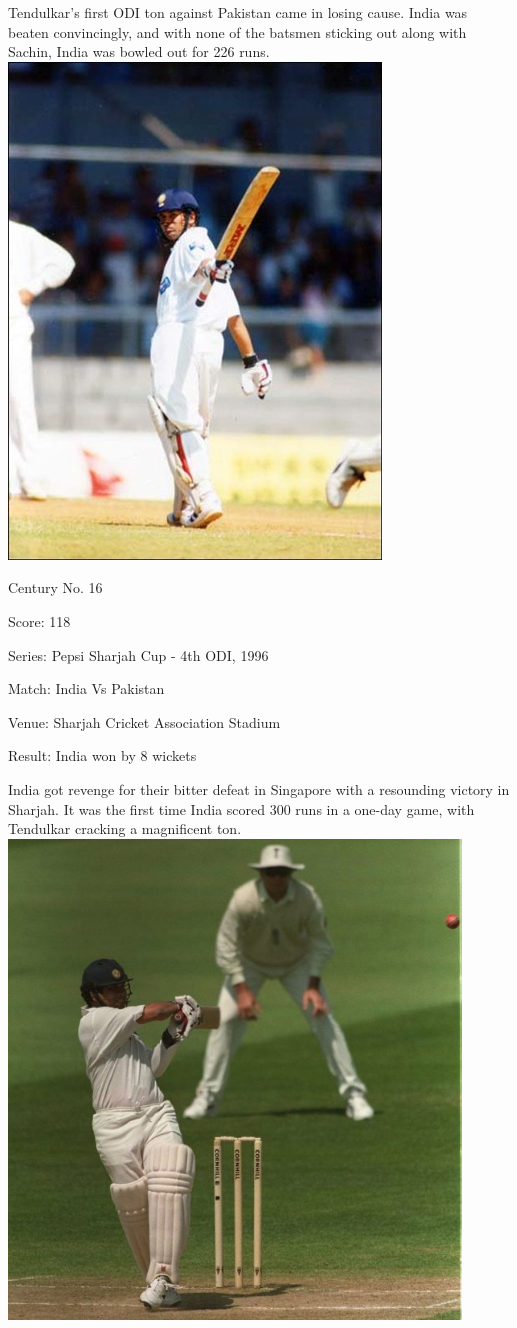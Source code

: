\documentclass[11pt, a4paper]{article}
\begin{document}
Tendulkar's first ODI ton against Pakistan came in losing cause. India was beaten convincingly, and with none of the batsmen sticking out along with Sachin, India was bowled out for 226 runs.
\newpage
\includegraphics[height=0.8\textheight]{pics/16.jpg}

Century No. 16 

Score: 118 

Series: Pepsi Sharjah Cup - 4th ODI, 1996 

Match: India Vs Pakistan 

Venue: Sharjah Cricket Association Stadium 

Result: India won by 8 wickets 

India got revenge for their bitter defeat in Singapore with a resounding victory in Sharjah. It was the first time India scored 300 runs in a one-day game, with Tendulkar cracking a magnificent ton.
\newpage
\includegraphics[width=0.9\textwidth]{pics/17.jpg}
\end{document}
